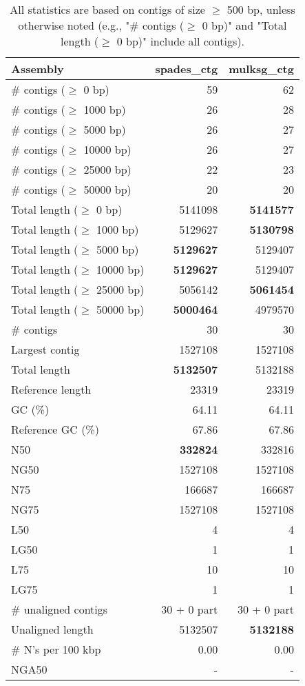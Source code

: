 \documentclass[12pt,a4paper]{article}
\begin{document}
\begin{table}[ht]
\begin{center}
\caption{All statistics are based on contigs of size $\geq$ 500 bp, unless otherwise noted (e.g., "\# contigs ($\geq$ 0 bp)" and "Total length ($\geq$ 0 bp)" include all contigs).}
\begin{tabular}{|l*{2}{|r}|}
\hline
Assembly & spades\_ctg & mulksg\_ctg \\ \hline
\# contigs ($\geq$ 0 bp) & 59 & 62 \\ \hline
\# contigs ($\geq$ 1000 bp) & 26 & 28 \\ \hline
\# contigs ($\geq$ 5000 bp) & 26 & 27 \\ \hline
\# contigs ($\geq$ 10000 bp) & 26 & 27 \\ \hline
\# contigs ($\geq$ 25000 bp) & 22 & 23 \\ \hline
\# contigs ($\geq$ 50000 bp) & 20 & 20 \\ \hline
Total length ($\geq$ 0 bp) & 5141098 & {\bf 5141577} \\ \hline
Total length ($\geq$ 1000 bp) & 5129627 & {\bf 5130798} \\ \hline
Total length ($\geq$ 5000 bp) & {\bf 5129627} & 5129407 \\ \hline
Total length ($\geq$ 10000 bp) & {\bf 5129627} & 5129407 \\ \hline
Total length ($\geq$ 25000 bp) & 5056142 & {\bf 5061454} \\ \hline
Total length ($\geq$ 50000 bp) & {\bf 5000464} & 4979570 \\ \hline
\# contigs & 30 & 30 \\ \hline
Largest contig & 1527108 & 1527108 \\ \hline
Total length & {\bf 5132507} & 5132188 \\ \hline
Reference length & 23319 & 23319 \\ \hline
GC (\%) & 64.11 & 64.11 \\ \hline
Reference GC (\%) & 67.86 & 67.86 \\ \hline
N50 & {\bf 332824} & 332816 \\ \hline
NG50 & 1527108 & 1527108 \\ \hline
N75 & 166687 & 166687 \\ \hline
NG75 & 1527108 & 1527108 \\ \hline
L50 & 4 & 4 \\ \hline
LG50 & 1 & 1 \\ \hline
L75 & 10 & 10 \\ \hline
LG75 & 1 & 1 \\ \hline
\# unaligned contigs & 30 + 0 part & 30 + 0 part \\ \hline
Unaligned length & 5132507 & {\bf 5132188} \\ \hline
\# N's per 100 kbp & 0.00 & 0.00 \\ \hline
NGA50 & - & - \\ \hline
\end{tabular}
\end{center}
\end{table}
\end{document}
